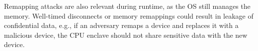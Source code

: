 Remapping attacks are also relevant during runtime, as the OS still manages the memory. Well-timed disconnects or memory remappings could result in leakage of confidential data, e.g., if an adversary remaps a \sphw device and replaces it with a malicious device, the CPU enclave should not share sensitive data with the new device. 



